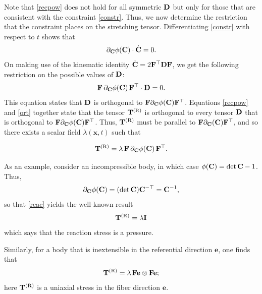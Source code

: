 Note that \eqref{recpow} does not hold for all symmetric $\mathbf{D}$ but only for those that are consistent with the constraint  \eqref{constr}. Thus, we now determine the restriction that the constraint places on the stretching tensor. Differentiating \eqref{constr} with respect to $t$ shows that
\begin{equation}
	\partial_{\mathbf{C}}\phi(\mathbf{C}) \cdot \dot{\mathbf{C}} = 0. 
\end{equation}
On making use of the kinematic identity $\dot{\mathbf{C}} = 2 \mathbf{F}^\top \mathbf{D} \mathbf{F}$, we get the following restriction on the possible values of $\mathbf{D}$:
\begin{equation}\label{ort}
	\mathbf{F} \, 	\partial_{\mathbf{C}}\phi(\mathbf{C}) \, \mathbf{F}^\top \cdot \mathbf{D} = 0.
\end{equation}
This equation states that $\mathbf{D}$ is orthogonal to $\mathbf{F} \partial_{\mathbf{C}}\phi(\mathbf{C}) \mathbf{F}^\top$. Equations \eqref{recpow} and \eqref{ort} together state that the tensor $ \mathbf{T}^{(\rm R)} $ is orthogonal to every tensor $\mathbf{D}$ that is orthogonal to $\mathbf{F} \partial_{\mathbf{C}}\phi(\mathbf{C})\mathbf{F}^\top$. Thus, $\mathbf{T}^{(\rm R)} $ must be parallel to $\mathbf{F}\partial_{\mathbf{C}} (\mathbf{C}) \mathbf{F}^\top$, and so there exists a scalar field $\lambda(\mathbf{x}, t)$ such that
\begin{definition}
\begin{equation}\label{reac}
	\mathbf{T}^{(\rm R)}  = \lambda \, \mathbf{F} \, \partial_{\mathbf{C}}\phi(\mathbf{C}) \, \mathbf{F}^\top.
\end{equation}
\end{definition}

\vspace{.3cm}

As an example, consider an incompressible body, in which case $\phi(\mathbf{C}) = \det \mathbf{C} - 1$. Thus,
\[
\partial_{\mathbf{C}}\phi(\mathbf{C}) = (\det \mathbf{C}) \mathbf{C}^{-\top} = \mathbf{C}^{-1},
\]
so that \eqref{reac} yields the well-known result
\begin{equation}
	\mathbf{T}^{(\rm R)}	 = \lambda \mathbf{I} 
\end{equation}
which says that the reaction stress is a pressure.

Similarly, for a body that is inextensible in the referential direction $\mathbf{e}$, one finds that
\begin{equation}
		\mathbf{T}^{(\rm R)}= \lambda \, \mathbf{F}\mathbf{e} \otimes \mathbf{F}\mathbf{e};
\end{equation}
here $	\mathbf{T}^{(\rm R)}$ is a uniaxial stress in the fiber direction $\mathbf{e}$.



